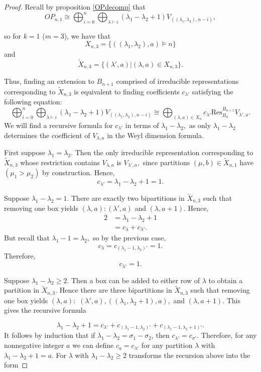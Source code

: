 \documentclass[10pt,a4paper]{amsart}
\begin{document}
\begin{proof}
Recall by proposition \ref{OPdecomp} that 
$$  
         OP_{n,1}\cong \bigoplus_{i=0}^n \bigoplus_{\lambda \vdash i} (\lambda_1 - \lambda_2 + 1)V_{((\lambda_1, \lambda_2),n-i)}, 
   $$

so for  $k=1 $ ($m=3$), we have that 
$$X_{n,3}=\{ ((\lambda_1,\lambda_2),a)\vDash n \}$$ 
and 
$$\tilde X_{n,3}= \{(\lambda',a)| (\lambda,a)\in X_{n,3}\}.$$

 Thus, finding an extension to $B_{n+1}$ comprised of irreducible representations corresponding to $\tilde X_{n,3}$ is equivalent to finding coefficients  $c_{\lambda' }$ satisfying the following equation:
\begin{equation}\label{eq: extension problem for OPn1}
    \bigoplus_{i=0}^n \bigoplus_{\lambda \vdash i} (\lambda_1 - \lambda_2 + 1)V_{((\lambda_1, \lambda_2),n-i)} \cong \bigoplus_{(\lambda, a) \in X_n} c_{\lambda'}\mathrm{Res}_{B_n}^{B_{n+1}} V_{\lambda',a}.
\end{equation}   
We will find a recursive formula for $c_{\lambda'}$ in terms of $\lambda_1-\lambda_2,$ as only $\lambda_1-\lambda_2$ determines the coefficient of $V_{\lambda,a}$ in the Weyl dimension formula. 


First suppose $\lambda_1=\lambda_2.$ Then the only irreducible representation corresponding to  $\tilde{X}_{n,3}$ whose restriction contains $V_{\lambda,a}$ is $V_{\lambda',a},$ since partitions  $(\mu,b)\in \tilde X_{n,1}$ have $(\mu_1>\mu_2)$ by construction. Hence, $$c_{\lambda'}= \lambda_1-\lambda_2+1=1.$$

Suppose $\lambda_1-\lambda_2=1.$ There are exactly two bipartitions in $\tilde X_{n,3}$ such that removing one box yields $(\lambda,a): (\lambda',a)$ and $(\lambda,a+1).$ Hence, 
\begin{align*}
    2 &= \lambda_1-\lambda_2+1\\
    &= c_{\lambda}+c_{\lambda'}.
\end{align*}
But recall that $\lambda_1-1=\lambda_2,$ so by the previous case,
$$ c_{\lambda}= c_{(\lambda_1-1,\lambda_2)'}=1.$$ Therefore, 
$$c_{\lambda'}=1.$$ 

Suppose $\lambda_1-\lambda_2\ge 2.$ Then a box can be added to either row of $\lambda$ to obtain a partition in $\tilde X_{n,3}.$ Hence there are three bipartitions in $\tilde X_{n,3}$ such that removing one box yields $(\lambda,a):$ $(\lambda',a), ((\lambda_1,\lambda_2+1),a),$ and $(\lambda,a+1).$ This gives the recursive formula  

\begin{equation} 
\lambda_1-\lambda_2 +1 = c_{\lambda'}+ c_{(\lambda_1-1,\lambda_2)'} + c_{(\lambda_1-1,\lambda_2+1)'} .
\label{eq:recursion}
\end{equation}
 It follows by induction that if $\lambda_1-\lambda_2=\sigma_1-\sigma_2$, then $c_{\lambda'}=c_{\sigma'}.$ Therefore, for any nonnegative integer $a$ we can define $c_a=c_{\lambda'}$ for any partition $\lambda$ with $\lambda_1-\lambda_2+1=a. $ For $\lambda$ with $\lambda_1-\lambda_2\ge 2$ transforms the recursion above into the form 


\end{proof}
\end{document}

